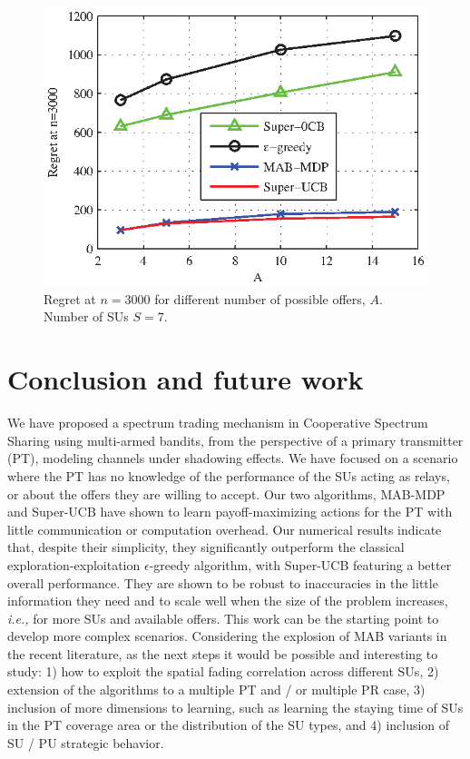 \begin{figure}[!t]
\centering
\includegraphics{VsA.eps}
\caption{Regret at $n = 3000$ for different number of possible offers, $A$. Number of SUs $S = 7$.}
\label{fig:VsA}
\end{figure}

\section{Conclusion and future work}\label{sec:Con}
We have proposed a spectrum trading mechanism in Cooperative Spectrum Sharing using multi-armed bandits, from the perspective of a primary transmitter (PT),  modeling channels under shadowing effects. 
We have focused on a scenario where the PT has no knowledge of the performance of the SUs acting as relays, or about the offers they are willing to accept. 
Our two algorithms, MAB-MDP and Super-UCB have shown to learn payoff-maximizing actions for the PT with little communication or computation overhead. 
Our numerical results indicate that, despite their simplicity, they significantly outperform the classical exploration-exploitation $\epsilon$-greedy algorithm, with Super-UCB featuring a better overall performance.
They are shown to be robust to inaccuracies in the little information they need and to scale well when the size of the problem increases, \textit{i.e.,} for more SUs and available offers.
This work can be the starting point to develop more complex scenarios.  
Considering the explosion of MAB variants in the recent literature, as the next steps it would be possible and interesting to study: 1) how to exploit the spatial fading correlation across different SUs, 2) extension of the algorithms to a multiple PT and / or multiple PR case, 3) inclusion of more dimensions to learning, such as learning the staying time of SUs in the PT coverage area or the distribution of the SU types, and 4) inclusion of SU / PU strategic behavior. 